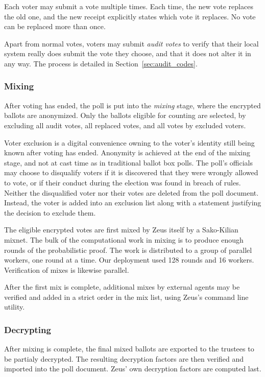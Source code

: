 \documentclass[letterpaper,10pt]{article}
\begin{document}
Each voter may submit a vote multiple times.
Each time, the new vote replaces the old one,
and the new receipt explicitly states which vote it replaces.
No vote can be replaced more than once.

Apart from normal votes, voters may submit \emph{audit votes} to verify
that their local system really does submit the vote they choose,
and that it does not alter it in any way.
The process is detailed in Section~\ref{sec:audit_codes}.

\subsubsection{Mixing}
\label{sec:mixing}
After voting has ended, the poll is put into the \emph{mixing} stage,
where the encrypted ballots are anonymized.
Only the ballots eligible for counting are selected, by excluding
all audit votes, all replaced votes, and all votes by excluded voters.

Voter exclusion is a digital convenience owning to
the voter's identity still being known after voting has ended.
Anonymity is achieved at the end of the mixing stage,
and not at cast time as in traditional ballot box polls.
The poll's officials may choose to disqualify voters if
it is discovered that they were wrongly allowed to vote, or if
their conduct during the election was found in breach of rules.
Neither the disqualified voter nor their votes are deleted from 
the poll document. Instead, the voter is added into an exclusion 
list along with a statement justifying the decision to exclude them.

The eligible encrypted votes are first mixed by Zeus itself
by a Sako-Kilian mixnet.
The bulk of the computational work in mixing is to produce
enough rounds of the probabilistic proof.
The work is distributed to a group of parallel workers,
one round at a time. Our deployment used 128 rounds and 16 workers.
Verification of mixes is likewise parallel.

After the first mix is complete, additional mixes by external agents
may be verified and added in a strict order in the mix list, using
Zeus's command line utility.

\subsubsection{Decrypting}
\label{sec:decrypting}

After mixing is complete, the final mixed ballots are exported to
the trustees to be partialy decrypted.
The resulting decryption factors are then verified and imported
into the poll document.
Zeus' own decryption factors are computed last.
\end{document}
